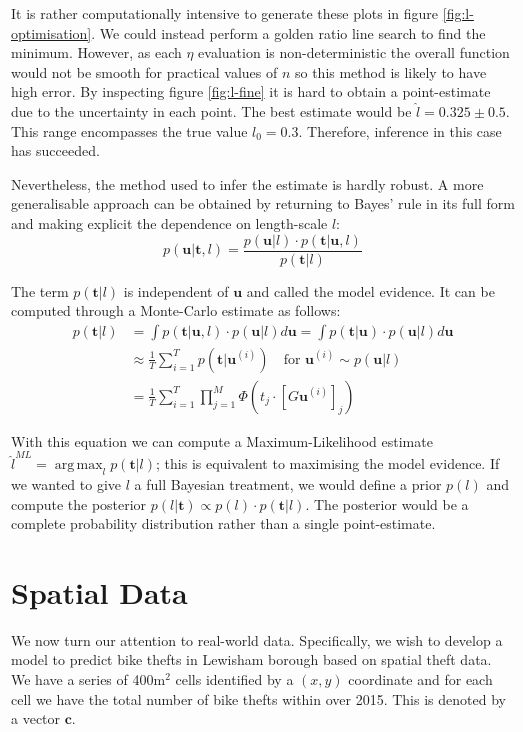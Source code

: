 \documentclass[]{article}
\DeclareMathOperator*{\argmax}{arg\,max}
\newcommand{\cbold}{\boldsymbol{c}}
\newcommand{\tbold}{\boldsymbol{t}}
\newcommand{\ubold}{\boldsymbol{u}}
\begin{document}
It is rather computationally intensive to generate these plots in figure \ref{fig:l-optimisation}. We could instead perform a golden ratio line search to find the minimum. However, as each $\eta$ evaluation is non-deterministic the overall function would not be smooth for practical values of $n$ so this method is likely to have high error. By inspecting figure \ref{fig:l-fine} it is hard to obtain a point-estimate due to the uncertainty in each point. The best estimate would be $\hat{l} = 0.325 \pm 0.5$. This range encompasses the true value $l_0 = 0.3$. Therefore, inference in this case has succeeded.

Nevertheless, the method used to infer the estimate is hardly robust. A more generalisable approach can be obtained by returning to Bayes' rule in its full form and making explicit the dependence on length-scale $l$:
%
\begin{equation}
	p(\ubold | \tbold, l) = \frac{p(\ubold | l) \cdot p(\tbold | \ubold, l)}{p(\tbold | l)}
\end{equation}

The term $p(\tbold | l)$ is independent of $\ubold$ and called the model evidence. It can be computed through a Monte-Carlo estimate as follows:
%
\begin{align}
	p(\tbold | l) &= \int p(\tbold | \ubold, l) \cdot p(\ubold | l) d\ubold = \int p(\tbold | \ubold) \cdot p(\ubold | l) d\ubold  \nonumber \\
	&\approx \frac{1}{T} \sum_{i=1}^{T} p(\tbold | \ubold^{(i)}) \quad \textrm{for } \ubold^{(i)} \sim p(\ubold | l) \nonumber \\
	&= \frac{1}{T} \sum_{i=1}^{T} \prod_{j=1}^{M} \Phi(t_j \cdot [G\ubold^{(i)}]_j)
\end{align}

With this equation we can compute a Maximum-Likelihood estimate $\hat{l}^{ML} = \argmax_l p(\tbold | l)$; this is equivalent to maximising the model evidence. If we wanted to give $l$ a full Bayesian treatment, we would define a prior $p(l)$ and compute the posterior $p(l | \tbold) \propto p(l) \cdot p(\tbold | l)$. The posterior would be a complete probability distribution rather than a single point-estimate.

\pagebreak
\section{Spatial Data}

We now turn our attention to real-world data. Specifically, we wish to develop a model to predict bike thefts in Lewisham borough based on spatial theft data. We have a series of 400m$^2$ cells identified by a $(x, y)$ coordinate and for each cell we have the total number of bike thefts within over 2015. This is denoted by a vector $\cbold$.
\end{document}
